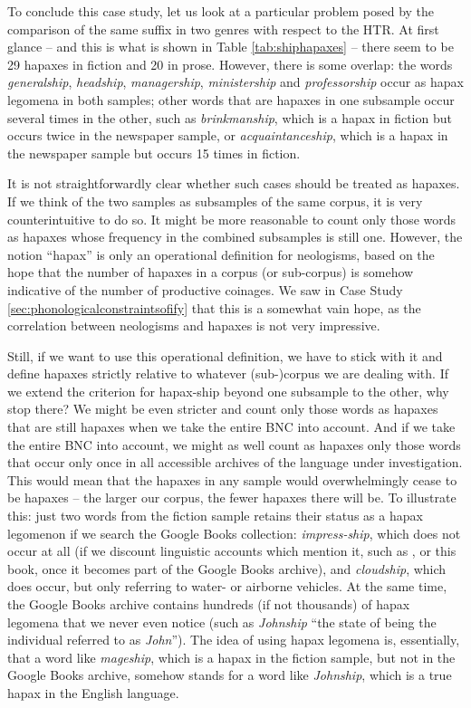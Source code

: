 To conclude this case study, let us look at a particular problem posed by the comparison of the same suffix in two genres with respect to the HTR. At first glance -- and this is what is shown in Table \ref{tab:shiphapaxes} -- there seem to be 29 hapaxes in fiction and 20 in prose. However, there is some overlap: the words \textit{generalship}, \textit{headship}, \textit{managership}, \textit{ministership} and \textit{professorship} occur as hapax legomena in both samples; other words that are hapaxes in one subsample occur several times in the other, such as \textit{brinkmanship}, which is a hapax in fiction but occurs twice in the newspaper sample, or \textit{acquaintanceship}, which is a hapax in the newspaper sample but occurs 15 times in fiction.

It is not straightforwardly clear whether such cases should be treated as hapaxes. If we think of the two samples as subsamples of the same corpus, it is very counterintuitive to do so. It might be more reasonable to count only those words as hapaxes whose frequency in the combined subsamples is still one. However, the notion ``hapax'' is only an operational definition for neologisms, based on the hope that the number of hapaxes in a corpus (or sub-corpus) is somehow indicative of the number of productive coinages. We saw in Case Study \ref{sec:phonologicalconstraintsofify} that this is a somewhat vain hope, as the correlation between neologisms and hapaxes is not very impressive.

Still, if we want to use this operational definition, we have to stick with it and define hapaxes strictly relative to whatever (sub-)corpus we are dealing with. If we extend the criterion for hapax-ship beyond one subsample to the other, why stop there? We might be even stricter and count only those words as hapaxes that are still hapaxes when we take the entire BNC into account. And if we take the entire BNC into account, we might as well count as hapaxes only those words that occur only once in all accessible archives of the language under investigation. This would mean that the hapaxes in any sample would overwhelmingly cease to be hapaxes -- the larger our corpus, the fewer hapaxes there will be. To illustrate this: just two words from the fiction sample retains their status as a hapax legomenon if we search the Google Books collection: \textit{impress-ship}, which does not occur at all (if we discount linguistic accounts which mention it, such as \citet{trips_lexical_2009}, or this book, once it becomes part of the Google Books archive), and \textit{cloudship}, which does occur, but only referring to water- or airborne vehicles. At the same time, the Google Books archive contains hundreds (if not thousands) of hapax legomena that we never even notice (such as \textit{Johnship} ``the state of being the individual referred to as \textit{John}''). The idea of using hapax legomena is, essentially, that a word like \textit{mageship}, which is a hapax in the fiction sample, but not in the Google Books archive, somehow stands for a word like \textit{Johnship}, which is a true hapax in the English language.


